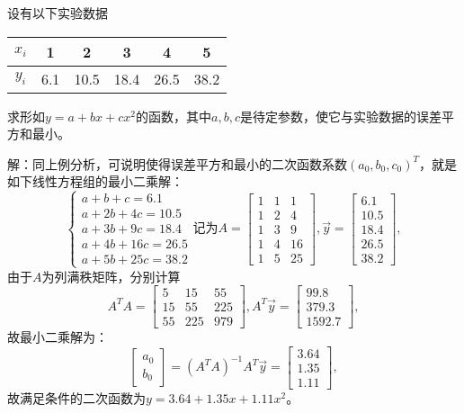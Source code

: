 \begin{eg}
设有以下实验数据
\begin{table}[H]
\centering
\begin{tabular}{cccccc}
  \hline
   $x_i$ & 1 & 2 & 3& 4 &5 \\
   \hline
   $y_i$ & 6.1 & 10.5 & 18.4& 26.5&38.2 \\
  \hline
\end{tabular}
\end{table}
求形如$y=a+bx+cx^2$的函数，其中$a,b,c$是待定参数，使它与实验数据的误差平方和最小。
\end{eg}
解：同上例分析，可说明使得误差平方和最小的二次函数系数$(a_0,b_0,c_0)^T$，就是
如下线性方程组的最小二乘解：
\begin{equation*}
\begin{cases}
a+b+c=6.1\\
a+2b+4c=10.5\\
a+3b+9c=18.4\\
a+4b+16c=26.5\\
a+5b+25c=38.2
\end{cases}
\text{记为}
A=\begin{bmatrix}
1&1&1\\1&2&4\\1&3&9\\1&4&16\\1&5&25
\end{bmatrix},
\vec{y}=\begin{bmatrix}
6.1\\10.5\\18.4\\26.5\\38.2
\end{bmatrix},
\end{equation*}
由于$A$为列满秩矩阵，分别计算
\begin{equation*}
A^TA=\begin{bmatrix}5&15&55\\15&55&225\\55&225&979\end{bmatrix},
A^T\vec{y}=\begin{bmatrix}99.8\\379.3\\1592.7\end{bmatrix},
\end{equation*}
故最小二乘解为：
\begin{equation*}
\begin{bmatrix}a_0\\b_0\end{bmatrix}=
(A^TA)^{-1}A^T\vec{y}=\begin{bmatrix}3.64\\1.35\\1.11\end{bmatrix},
\end{equation*}
故满足条件的二次函数为$y=3.64+1.35x+1.11x^2$。

